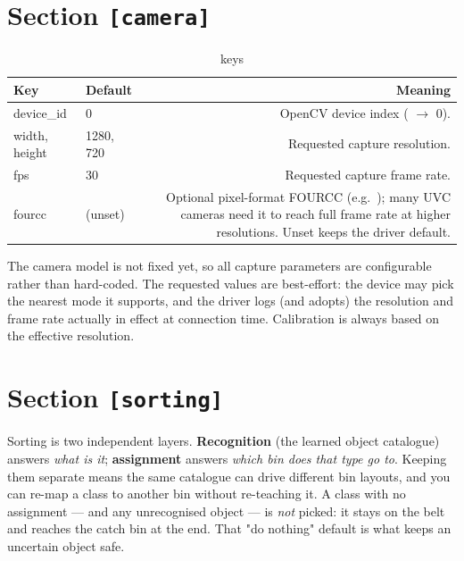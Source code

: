 \section{Section \texttt{[camera]}}
%
\begin{table}[h]
  \centering
  \begin{tabularx}{\textwidth}{KTD}
    \toprule
    \textbf{Key} & \textbf{Default} & \textbf{Meaning} \\
    \midrule
    device\_id & 0 & OpenCV device index ( $\rightarrow$ 0). \\
    width, height & 1280, 720 & Requested capture resolution. \\
    fps & 30 & Requested capture frame rate. \\
    fourcc & (unset) & Optional pixel-format FOURCC (e.g.\ );
      many UVC cameras need it to reach full frame rate at higher
      resolutions. Unset keeps the driver default. \\
    \bottomrule
  \end{tabularx}
  \caption{\cfg{[camera]} keys}
\end{table}

The camera model is not fixed yet, so all capture parameters are
configurable rather than hard-coded. The requested values are best-effort:
the device may pick the nearest mode it supports, and the driver logs (and
adopts) the resolution and frame rate actually in effect at connection
time. Calibration is always based on the effective resolution.

\section{Section \texttt{[sorting]}}
%
Sorting is two independent layers. \textbf{Recognition} (the learned object
catalogue) answers \emph{what is it}; \textbf{assignment} answers \emph{which
bin does that type go to}. Keeping them separate means the same catalogue can
drive different bin layouts, and you can re-map a class to another bin without
re-teaching it. A class with no assignment --- and any unrecognised object ---
is \emph{not} picked: it stays on the belt and reaches the catch bin at the
end. That "do nothing" default is what keeps an uncertain object safe.

